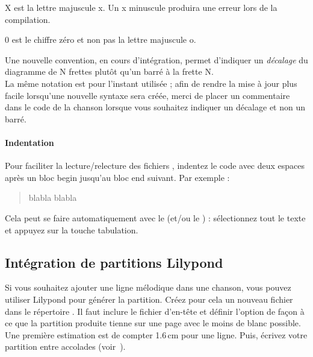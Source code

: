 \begin{nota}
  X est la lettre majuscule x. Un x minuscule produira une erreur lors de la compilation.

  0 est le chiffre zéro et non pas la lettre majuscule o.
\end{nota}

\begin{nota}
  Une nouvelle convention, en cours d'intégration, permet d'indiquer un
  \emph{décalage} du diagramme de N frettes plutôt qu'un barré à la
  frette N.\\
  La même notation est pour l'instant utilisée ; afin de rendre la mise à
  jour plus facile lorsqu'une nouvelle syntaxe sera créée, merci de
  placer un commentaire dans le code de la chanson lorsque vous souhaitez
  indiquer un décalage et non un barré.
\end{nota}

\paragraph{Indentation}
Pour faciliter la lecture/relecture des fichiers , indentez le
code avec deux espaces après un bloc begin jusqu'au bloc end
suivant. Par exemple :
\begin{song}
\beginsong
  \begin{verse}
    blabla
    blabla
  \end{verse}
\endsong
\end{song}
Cela peut se faire automatiquement avec le \client (et/ou le
\emacsmode) : sélectionnez tout le texte et appuyez sur la touche
tabulation.


\subsection{Intégration de partitions Lilypond}

Si vous souhaitez ajouter une ligne mélodique dans une chanson, vous
pouvez utiliser Lilypond pour générer la partition. Créez pour cela
un nouveau fichier  dans le répertoire
. Il faut inclure le fichier d'en-tête
 et définir l'option  de façon à ce que la
partition produite tienne sur une page avec le moins de blanc
possible. Une première estimation est de compter 1.6\,cm pour une
ligne. Puis, écrivez votre partition entre accolades
(voir~).

